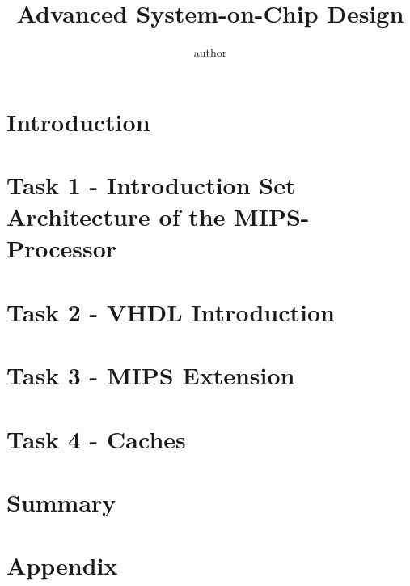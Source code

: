 \documentclass[11pt,a4paper]{article}
\title{Advanced System-on-Chip Design}
\author{author}
\begin{document}


\tableofcontents
\newpage
\listoffigures
\newpage
\listoftables
\newpage
\lstlistoflistings

\newpage
\section{Introduction}


\newpage
\section{Task 1 - Introduction Set Architecture of the MIPS-Processor}


\newpage
\section{Task 2 - VHDL Introduction}


\newpage
\section{Task 3 - MIPS Extension}


\newpage
\section{Task 4 - Caches}


\newpage
\section{Summary}


\newpage
\pagestyle{scrheadings}
\section{Appendix}



\newpage
\nocite{*}
\printbibliography

\end{document}
